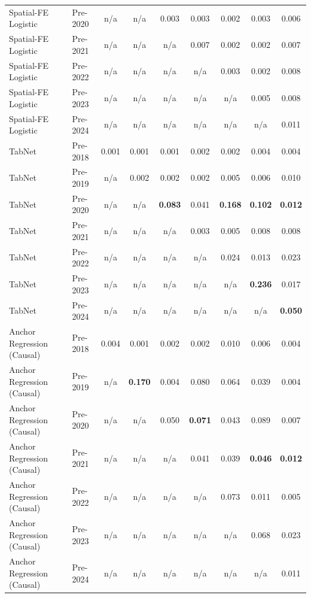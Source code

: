 \begin{table}[htbp]
{\begin{tabular}{l lccccccc}
Spatial-FE Logistic & Pre-2020 & n/a & n/a & 0.003 & 0.003 & 0.002 & 0.003 & 0.006 \\
Spatial-FE Logistic & Pre-2021 & n/a & n/a & n/a & 0.007 & 0.002 & 0.002 & 0.007 \\
Spatial-FE Logistic & Pre-2022 & n/a & n/a & n/a & n/a & 0.003 & 0.002 & 0.008 \\
Spatial-FE Logistic & Pre-2023 & n/a & n/a & n/a & n/a & n/a & 0.005 & 0.008 \\
Spatial-FE Logistic & Pre-2024 & n/a & n/a & n/a & n/a & n/a & n/a & 0.011 \\
TabNet & Pre-2018 & 0.001 & 0.001 & 0.001 & 0.002 & 0.002 & 0.004 & 0.004 \\
TabNet & Pre-2019 & n/a & 0.002 & 0.002 & 0.002 & 0.005 & 0.006 & 0.010 \\
TabNet & Pre-2020 & n/a & n/a & \textbf{0.083} & 0.041 & \textbf{0.168} & \textbf{0.102} & \textbf{0.012} \\
TabNet & Pre-2021 & n/a & n/a & n/a & 0.003 & 0.005 & 0.008 & 0.008 \\
TabNet & Pre-2022 & n/a & n/a & n/a & n/a & 0.024 & 0.013 & 0.023 \\
TabNet & Pre-2023 & n/a & n/a & n/a & n/a & n/a & \textbf{0.236} & 0.017 \\
TabNet & Pre-2024 & n/a & n/a & n/a & n/a & n/a & n/a & \textbf{0.050} \\
Anchor Regression (Causal) & Pre-2018 & 0.004 & 0.001 & 0.002 & 0.002 & 0.010 & 0.006 & 0.004 \\
Anchor Regression (Causal) & Pre-2019 & n/a & \textbf{0.170} & 0.004 & 0.080 & 0.064 & 0.039 & 0.004 \\
Anchor Regression (Causal) & Pre-2020 & n/a & n/a & 0.050 & \textbf{0.071} & 0.043 & 0.089 & 0.007 \\
Anchor Regression (Causal) & Pre-2021 & n/a & n/a & n/a & 0.041 & 0.039 & \textbf{0.046} & \textbf{0.012} \\
Anchor Regression (Causal) & Pre-2022 & n/a & n/a & n/a & n/a & 0.073 & 0.011 & 0.005 \\
Anchor Regression (Causal) & Pre-2023 & n/a & n/a & n/a & n/a & n/a & 0.068 & 0.023 \\
Anchor Regression (Causal) & Pre-2024 & n/a & n/a & n/a & n/a & n/a & n/a & 0.011 \\
\bottomrule
\end{tabular}%
}
\end{table}